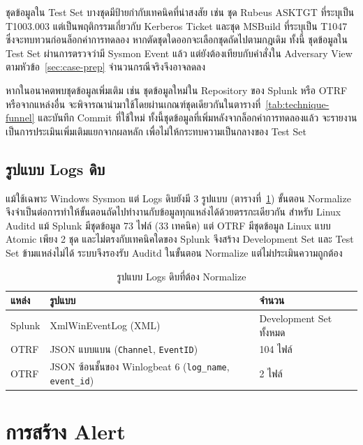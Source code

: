 ชุดข้อมูลใน Test Set บางชุดมีป้ายกำกับเทคนิคที่น่าสงสัย เช่น ชุด Rubeus ASKTGT ที่ระบุเป็น T1003.003
แต่เป็นพฤติกรรมเกี่ยวกับ Kerberos Ticket และชุด MSBuild ที่ระบุเป็น T1047
ซึ่งจะทบทวนก่อนล็อกค่าการทดลอง หากตัดชุดใดออกจะเลือกชุดถัดไปตามกฎเดิม
ทั้งนี้ ชุดข้อมูลใน Test Set ผ่านการตรวจว่ามี Sysmon Event แล้ว
แต่ยังต้องเทียบกับคำสั่งใน Adversary View ตามหัวข้อ~\ref{sec:case-prep} จำนวนกรณีจริงจึงอาจลดลง

หากในอนาคตพบชุดข้อมูลเพิ่มเติม เช่น ชุดข้อมูลใหม่ใน Repository ของ Splunk หรือ OTRF หรือจากแหล่งอื่น
จะพิจารณานำมาใช้โดยผ่านเกณฑ์ชุดเดียวกันในตารางที่~\ref{tab:technique-funnel}
และบันทึก Commit ที่ใช้ใหม่ ทั้งนี้ชุดข้อมูลที่เพิ่มหลังจากล็อกค่าการทดลองแล้ว
จะรายงานเป็นการประเมินเพิ่มเติมแยกจากผลหลัก เพื่อไม่ให้กระทบความเป็นกลางของ Test Set

\subsection{รูปแบบ Logs ดิบ}
แม้ใช้เฉพาะ Windows Sysmon แต่ Logs ดิบยังมี 3 รูปแบบ (ตารางที่~\ref{tab:raw-formats})
ขั้นตอน Normalize จึงจำเป็นต่อการทำให้ขั้นตอนถัดไปทำงานกับข้อมูลทุกแหล่งได้ด้วยตรรกะเดียวกัน
สำหรับ Linux Auditd แม้ Splunk มีชุดข้อมูล 73 ไฟล์ (33 เทคนิค) แต่ OTRF มีชุดข้อมูล Linux แบบ Atomic เพียง 2 ชุด
และไม่ตรงกับเทคนิคใดของ Splunk จึงสร้าง Development Set และ Test Set ข้ามแหล่งไม่ได้
ระบบจึงรองรับ Auditd ในขั้นตอน Normalize แต่ไม่ประเมินความถูกต้อง

\begin{table}[ht]
  \centering
  \caption{รูปแบบ Logs ดิบที่ต้อง Normalize}
  \label{tab:raw-formats}
  \small
  \begin{tabular}{|l|l|l|}
    \hline
    \textbf{แหล่ง} & \textbf{รูปแบบ} & \textbf{จำนวน} \\ \hline
    Splunk & XmlWinEventLog (XML) & Development Set ทั้งหมด \\ \hline
    OTRF & JSON แบบแบน (\texttt{Channel}, \texttt{EventID}) & 104 ไฟล์ \\ \hline
    OTRF & JSON ซ้อนชั้นของ Winlogbeat 6 (\texttt{log\_name}, \texttt{event\_id}) & 2 ไฟล์ \\ \hline
  \end{tabular}
\end{table}

\section{การสร้าง Alert}
\label{sec:alert}

